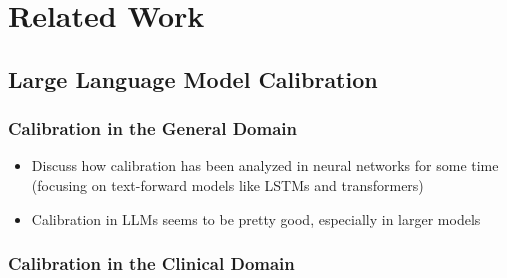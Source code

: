 \chapter{Related Work} \label{chapter:related-work}

\section{Large Language Model Calibration}

\subsection{Calibration in the General Domain}
\begin{itemize}
    \item Discuss how calibration has been analyzed in neural networks for some time (focusing on text-forward models like LSTMs and transformers)
    \item Calibration in LLMs seems to be pretty good, especially in larger models
\end{itemize}

\subsection{Calibration in the Clinical Domain}



